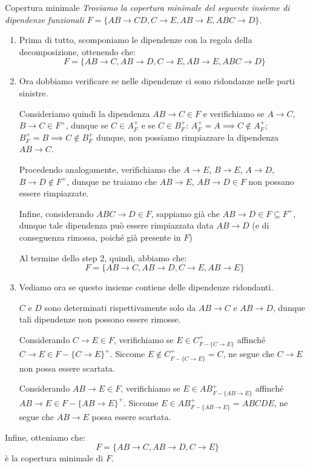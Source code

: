 \begin{Example}{Copertura minimale}{}
    \textit{Troviamo la copertura minimale del seguente insieme di dipendenze funzionali $F = \{AB\to CD, C\to E, AB\to E, ABC\to D\}$.}

    \begin{enumerate}
        \item Prima di tutto, scomponiamo le dipendenze con la regola della decomposizione, ottenendo che:
        \begin{equation*}
            F = \{AB\to C, AB\to D, C\to E, AB\to E, ABC\to D\}
        \end{equation*}

        \item Ora dobbiamo verificare se nelle dipendenze ci sono ridondanze nelle parti sinistre.
        
        Consideriamo quindi la dipendenza $AB\to C\in F$ e verifichiamo se $A\to C$, $B\to C\in F^+$, dunque se $C\in A^+_F$ e se $C\in B^+_F$: $A^+_F = A\implies C\notin A^+_F$; $B^+_F = B\implies C\notin B^+_F$ dunque, non possiamo rimpiazzare la dipendenza $AB\to C$. 
        
        Procedendo analogamente, verifichiamo che $A\to E$, $B\to E$, $A\to D$, $B\to D\notin F^+$, dunque ne traiamo che $AB\to E$, $AB\to D\in F$ non possano essere rimpiazzate. 
        
        Infine, considerando $ABC\to D\in F$, sappiamo già che $AB\to D\in F\subseteq F^+$, dunque tale dipendenza può essere rimpiazzata data $AB\to D$ (e di conseguenza rimossa, poiché già presente in $F$)
        
        Al termine dello step 2, quindi, abbiamo che:
        \begin{equation*}
            F = \{AB\to C, AB\to D, C\to E, AB\to E\}
        \end{equation*}

        \item Vediamo ora se questo insieme contiene delle dipendenze ridondanti. 
        
        $C$ e $D$ sono determinati rispettivamente solo da $AB\to C$ e $AB\to D$, dunque tali dipendenze non possono essere rimosse. 
        
        Considerando $C\to E\in F$, verifichiamo se $E\in C^+_{F-\{C\to E\}}$ affinché $C\to E\in F-\{C\to E\}^+$. Siccome $E\notin C^+_{F-\{C\to E\}} = C$, ne segue che $C\to E$ non possa essere scartata. 
        
        Considerando $AB\to E\in F$, verifichiamo se $E\in AB^+_{F-\{AB\to E\}}$ affinché $AB\to E\in F-\{AB\to E\}^+$. Siccome $E\in AB^+_{F-\{AB\to E\}} = ABCDE$, ne segue che $AB\to E$ possa essere scartata.
    \end{enumerate}
    Infine, otteniamo che:
    \begin{equation*}
        F = \{AB\to C, AB\to D, C\to E\}
    \end{equation*}
    è la copertura minimale di $F$.
\end{Example}

